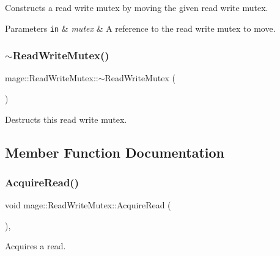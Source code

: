 Constructs a read write mutex by moving the given read write mutex.


\begin{DoxyParams}[1]{Parameters}
\mbox{\tt in}  & {\em mutex} & A reference to the read write mutex to move. \\
\hline
\end{DoxyParams}
\hypertarget{structmage_1_1_read_write_mutex_a73676d9414658d63edfe443ee1d55c8b}{}\label{structmage_1_1_read_write_mutex_a73676d9414658d63edfe443ee1d55c8b} 
\subsubsection{\texorpdfstring{$\sim$\+Read\+Write\+Mutex()}{~ReadWriteMutex()}}
{\footnotesize\ttfamily mage\+::\+Read\+Write\+Mutex\+::$\sim$\+Read\+Write\+Mutex (\begin{DoxyParamCaption}{ }\end{DoxyParamCaption})}

Destructs this read write mutex. 

\subsection{Member Function Documentation}
\hypertarget{structmage_1_1_read_write_mutex_add04196fda61967f81901bcba79938bc}{}\label{structmage_1_1_read_write_mutex_add04196fda61967f81901bcba79938bc} 
\subsubsection{\texorpdfstring{Acquire\+Read()}{AcquireRead()}}
{\footnotesize\ttfamily void mage\+::\+Read\+Write\+Mutex\+::\+Acquire\+Read (\begin{DoxyParamCaption}{ }\end{DoxyParamCaption})\hspace{0.3cm}{\ttfamily [private]}, {\ttfamily [noexcept]}}

Acquires a read. \hypertarget{structmage_1_1_read_write_mutex_ab99adb4241990fa0dd2d3ba03322d1c3}{}\label{structmage_1_1_read_write_mutex_ab99adb4241990fa0dd2d3ba03322d1c3} 
